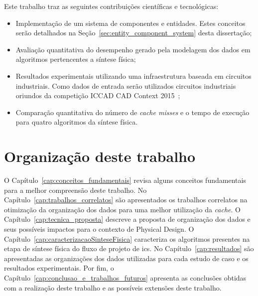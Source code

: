     Este trabalho traz as seguintes contribuições científicas e tecnológicas:

    \begin{itemize}
        \item Implementação de um sistema de componentes e entidades. Estes conceitos serão detalhados na Seção~\ref{sec:entity_component_system} desta dissertação;
        \item Avaliação quantitativa do desempenho gerado pela modelagem dos dados em algoritmos pertencentes a síntese física;
        \item Resultados experimentais utilizando uma infraestrutura baseada em circuitos industriais. Como dados de entrada serão utilizados circuitos industriais oriundos da competição ICCAD CAD Context 2015~\cite{kim2015};
        \item Comparação quantitativa do número de \textit{cache misses} e o tempo de execução para quatro algoritmos da síntese física.  
    \end{itemize}


%

\section{Organização deste trabalho}

O Capítulo~\ref{cap:conceitos_fundamentais} revisa alguns conceitos fundamentais para a melhor compreensão deste trabalho.
No Capítulo~\ref{cap:trabalhos_correlatos} são apresentados os trabalhos correlatos na otimização da organização dos dados para uma melhor utilização da \textit{cache}.
O Capítulo~\ref{cap:tecnica_proposta} descreve a proposta de organização dos dados e seus possíveis impactos para o contexto de Physical Design.
O Capítulo~\ref{cap:caracterizacaoSinteseFisica} caracteriza os algoritmos presentes na etapa de síntese física do fluxo de projeto de \acp{ic}.
No Capítulo~\ref{cap:resultados} são apresentadas as organizações dos dados utilizadas para cada estudo de caso e os resultados experimentais.
Por fim, o Capítulo~\ref{cap:conclusao_e_trabalhos_futuros} apresenta as conclusões obtidas com a realização deste trabalho e as possíveis extensões deste trabalho.

